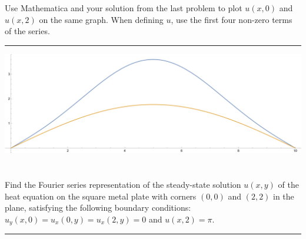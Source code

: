 \documentclass[10pt]{article}
\begin{document}
\newpage

\section{\underline{}}
\label{sec: Problem 3}

\noindent
Use Mathematica and your solution from the last problem to plot $ u(x,0) $ and $ u(x,2) $ on the same graph. 
When defining $ u $, use the first four non-zero terms of the series.  \\
\vspace{2.5mm}

\hrule 

\vspace{7.5mm}

\includegraphics[width=\textwidth]{3.png}

\newpage

\section{\underline{}}
\label{sec: Problem 4}

\noindent
Find the Fourier series representation of the steady-state solution $ u(x,y) $ 
of the heat equation on the square metal plate with corners $ (0,0) $ and $ (2,2) $ 
in the plane, satisfying the following boundary conditions: 
$ u_y(x,0) = u_x(0,y) = u_x(2,y) = 0 $ and $ u(x,2) = \pi $. \\
\vspace{2.5mm}

\hrule 

\vspace{7.5mm}
\end{document}
